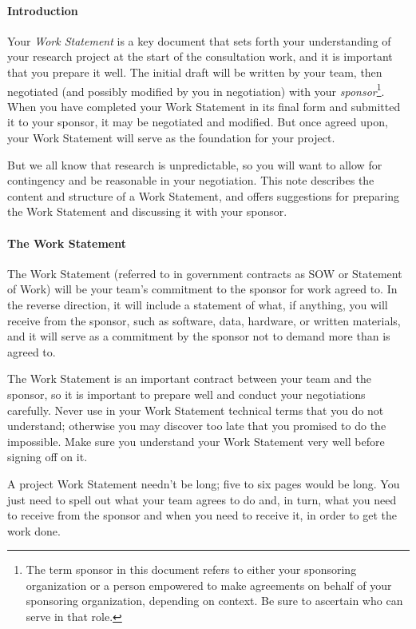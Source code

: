 \documentclass[12pt]{article}
\begin{document}
\paragraph{Introduction} 
Your \emph{Work Statement} is a key document that sets forth your
understanding of your research project at the start of the consultation
work, and it is important that you prepare it well. The initial draft will be
written by your team, then negotiated (and possibly modified by you in
negotiation) with your \emph{sponsor}\footnote{The term sponsor in
  this document refers to either your sponsoring organization or a
  person empowered to make agreements on behalf of your sponsoring
  organization, depending on context. Be sure to ascertain who can
  serve in that role.}.
When you have completed your Work
Statement in its final form and submitted it to your sponsor, it may
be negotiated and modified. But once agreed upon, your Work Statement
will serve as the foundation for your project.

But we all know that research is unpredictable, so you will want to
allow for contingency and be reasonable in your negotiation. This note
describes the content and structure of a Work Statement,
and offers suggestions for preparing the Work Statement and discussing 
it with your sponsor.

\paragraph{The Work Statement}
The Work Statement (referred to in government contracts as SOW or
Statement of Work) will be your team's commitment to the sponsor for
work agreed to.  In the reverse direction, it will include a statement
of what, if anything, you will receive from the sponsor, such as
software, data, hardware, or written materials, and it will serve as a
commitment by the sponsor not to demand more than is agreed to.

The Work Statement is an important contract between your team and the
sponsor, so it is important to prepare well and conduct your
negotiations carefully. Never use in your Work Statement technical
terms that you do not understand; otherwise you may discover too late
that you promised to do the impossible. Make sure you understand your
Work Statement very well before signing off on it.

A project Work Statement needn't be long; five to six pages would be
long. You just need to spell out what your team agrees to do and, in
turn, what you need to receive from the sponsor and when you need to
receive it, in order to get the work done.
\end{document}
